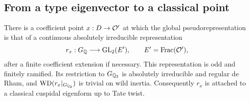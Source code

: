 \subsection{From a type eigenvector to a classical point}

\begin{proposition}\label{prop:regular-point}
There is a coefficient point $x:D\to\mathcal O'$ at which the global
pseudorepresentation is that of a continuous absolutely irreducible
representation
\[
                    r_x:G_{\mathbb Q}\longrightarrow\operatorname{GL}_2(E'),
                    \qquad E'=\operatorname{Frac}(\mathcal O'),
\]
after a finite coefficient extension if necessary.  This representation
is odd and finitely ramified.  Its restriction to $G_{\mathbb Q_2}$ is
absolutely irreducible and regular de Rham, and
$\operatorname{WD}(r_x|_{G_{\mathbb Q_2}})$ is trivial on wild inertia.  Consequently
$r_x$ is attached to a classical cuspidal eigenform up to Tate twist.
\end{proposition}
